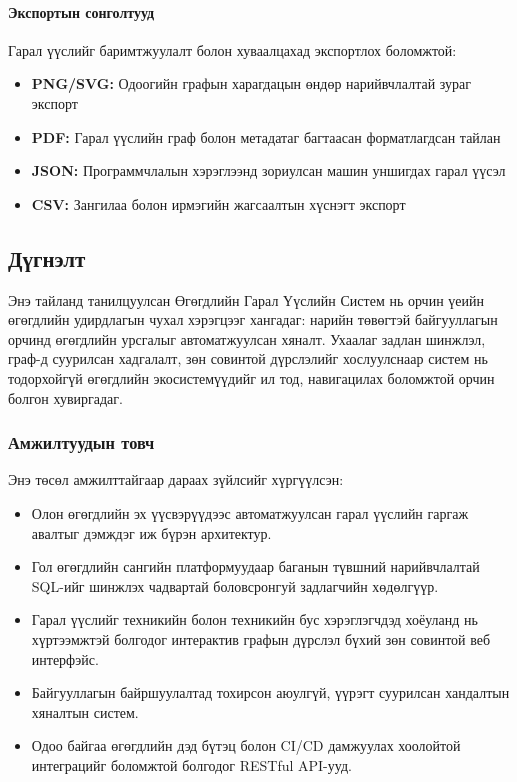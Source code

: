 \paragraph{Экспортын сонголтууд}
Гарал үүслийг баримтжуулалт болон хуваалцахад экспортлох боломжтой:
\begin{itemize}
    \item \textbf{PNG/SVG:} Одоогийн графын харагдацын өндөр нарийвчлалтай зураг экспорт
    \item \textbf{PDF:} Гарал үүслийн граф болон метадатаг багтаасан форматлагдсан тайлан
    \item \textbf{JSON:} Программчлалын хэрэглээнд зориулсан машин уншигдах гарал үүсэл
    \item \textbf{CSV:} Зангилаа болон ирмэгийн жагсаалтын хүснэгт экспорт
\end{itemize}

\subsection{Дүгнэлт}
\label{subsec:dl_conclusion}

Энэ тайланд танилцуулсан Өгөгдлийн Гарал Үүслийн Систем нь орчин үеийн өгөгдлийн удирдлагын чухал хэрэгцээг хангадаг: нарийн төвөгтэй байгууллагын орчинд өгөгдлийн урсгалыг автоматжуулсан хяналт. Ухаалаг задлан шинжлэл, граф-д суурилсан хадгалалт, зөн совинтой дүрслэлийг хослуулснаар систем нь тодорхойгүй өгөгдлийн экосистемүүдийг ил тод, навигацилах боломжтой орчин болгон хувиргадаг.

\subsubsection{Амжилтуудын товч}

Энэ төсөл амжилттайгаар дараах зүйлсийг хүргүүлсэн:

\begin{itemize}
    \item Олон өгөгдлийн эх үүсвэрүүдээс автоматжуулсан гарал үүслийн гаргаж авалтыг дэмждэг иж бүрэн архитектур.
    
    \item Гол өгөгдлийн сангийн платформуудаар баганын түвшний нарийвчлалтай SQL-ийг шинжлэх чадвартай боловсронгуй задлагчийн хөдөлгүүр.
    
    \item Гарал үүслийг техникийн болон техникийн бус хэрэглэгчдэд хоёуланд нь хүртээмжтэй болгодог интерактив графын дүрслэл бүхий зөн совинтой веб интерфэйс.
    
    \item Байгууллагын байршуулалтад тохирсон аюулгүй, үүрэгт суурилсан хандалтын хяналтын систем.
    
    \item Одоо байгаа өгөгдлийн дэд бүтэц болон CI/CD дамжуулах хоолойтой интеграцийг боломжтой болгодог RESTful API-ууд.
\end{itemize}


